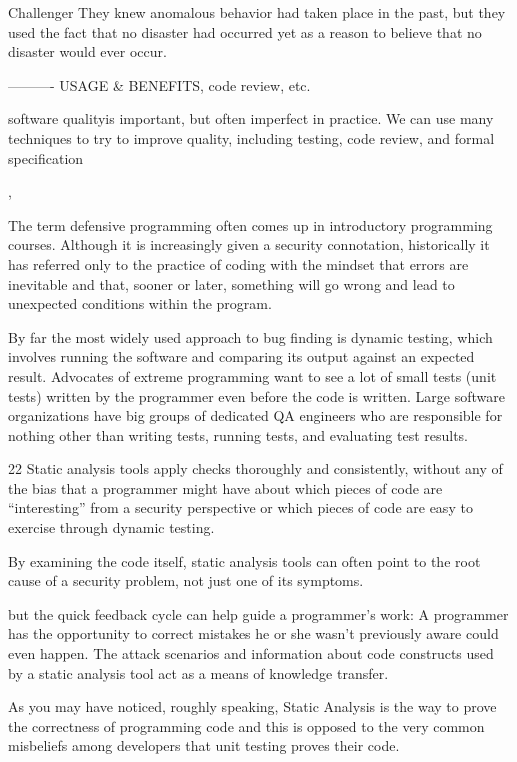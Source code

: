 Challenger
They knew
anomalous behavior had taken place in the past, but they used the fact that
no disaster had occurred yet as a reason to believe that no disaster would
ever occur.




----------
USAGE & BENEFITS, code review, etc.

software qualityis important, but often imperfect in practice. We can use many
techniques to try to improve quality, including testing, code review, and formal specification

,


The term defensive programming often comes up in introductory programming courses. Although it is increasingly given a security connotation, historically it has referred only to the practice of coding with the mindset that errors are inevitable and that, sooner or later, something will go wrong and
lead to unexpected conditions within the program.

By far the most
widely used approach to bug finding is dynamic testing, which involves
running the software and comparing its output against an expected result.
Advocates of extreme programming want to see a lot of small tests (unit
tests) written by the programmer even before the code is written. Large
software organizations have big groups of dedicated QA engineers who are
responsible for nothing other than writing tests, running tests, and evaluating test results.

22
Static analysis tools apply checks thoroughly and consistently, without
any of the bias that a programmer might have about which pieces of
code are “interesting” from a security perspective or which pieces of
code are easy to exercise through dynamic testing.

By examining the code itself, static analysis tools can often point to the
root cause of a security problem, not just one of its symptoms.

but the quick feedback cycle can help guide a
programmer’s work: A programmer has the opportunity to correct mistakes he or she wasn’t previously aware could even happen. The attack
scenarios and information about code constructs used by a static analysis tool act as a means of knowledge transfer.

As you may have noticed, roughly speaking, Static Analysis is the way to prove the correctness of programming code and this is opposed to the very common misbeliefs among developers that unit testing proves their code.


